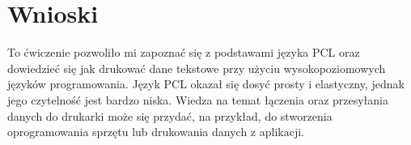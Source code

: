 \documentclass{article}
\begin{document}
\section{Wnioski}

To ćwiczenie pozwoliło mi zapoznać się z podstawami języka PCL oraz dowiedzieć się jak drukować dane tekstowe przy użyciu wysokopoziomowych języków programowania. Język PCL
okazał się dosyć prosty i elastyczny, jednak jego czytelność jest bardzo niska.
Wiedza na temat łączenia oraz przesyłania danych do drukarki może się przydać, na przykład, do stworzenia oprogramowania sprzętu lub drukowania danych z aplikacji.
\newpage

\listoflistings


\end{document}
